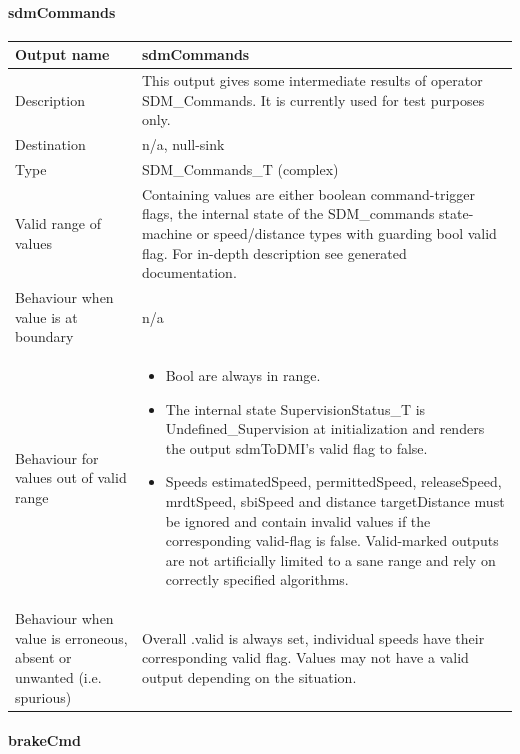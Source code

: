 \paragraph{sdmCommands}

\begin{longtable}{p{}p{}}
\toprule
Output name				& sdmCommands \\
\midrule
Description				& This output gives some intermediate results of operator SDM\_Commands. It is currently used for test purposes only. \\
\midrule
Destination				& n/a, null-sink \\ 
\midrule
Type					& SDM\_Commands\_T (complex) \\
\midrule
Valid range of values	& Containing values are either boolean command-trigger flags, the internal state of the SDM\_commands state-machine or speed/distance types with guarding bool valid flag. For in-depth description see generated documentation.\\
\midrule
Behaviour when value is at boundary	& n/a \\
\midrule
Behaviour for values out of valid range	& 
\begin{itemize}
\item Bool are always in range.
\item The internal state SupervisionStatus\_T is Undefined\_Supervision at initialization and renders the output sdmToDMI's valid flag to false.
\item Speeds estimatedSpeed, permittedSpeed, releaseSpeed, mrdtSpeed, sbiSpeed and distance targetDistance must be ignored and contain invalid values if the corresponding valid-flag is false. Valid-marked outputs are not artificially limited to a sane range and rely on correctly specified algorithms.
\end{itemize}\\
\midrule
Behaviour when value is erroneous, absent or unwanted (i.e. spurious) & Overall .valid is always set, individual speeds have their corresponding valid flag. Values may not have a valid output depending on the situation. \\
\bottomrule
\end{longtable}

\paragraph{brakeCmd}

